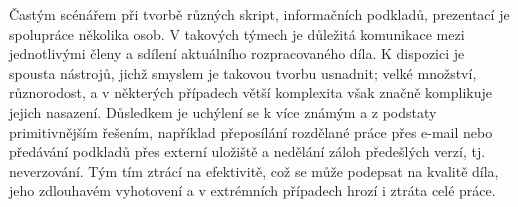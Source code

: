 \begin{introduction}
	Častým scénářem při tvorbě různých skript, informačních podkladů, prezentací je spolupráce několika osob. V takových týmech je důležitá komunikace mezi jednotlivými členy a sdílení aktuálního rozpracovaného díla. K dispozici je spousta nástrojů, jichž smyslem je takovou tvorbu usnadnit; velké množství, různorodost, a v některých případech větší komplexita však značně komplikuje jejich nasazení. Důsledkem je uchýlení se k více známým a z podstaty primitivnějším řešením, například přeposílání rozdělané práce přes e-mail nebo předávání podkladů přes externí uložiště a nedělání záloh předešlých verzí, tj. neverzování. Tým tím ztrácí na efektivitě, což se může podepsat na kvalitě díla, jeho zdlouhavém vyhotovení a v extrémních případech hrozí i ztráta celé práce.
\end{introduction}